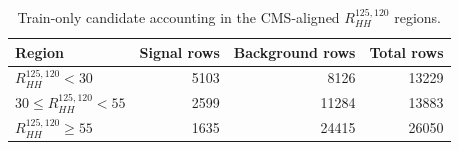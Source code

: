 \begin{table}[htbp]
\centering
\caption{Train-only candidate accounting in the CMS-aligned $R_{HH}^{125,120}$ regions.}
\label{tab:hh4b_expanded_cut_regions}
\begin{tabular}{lrrr}
\toprule
Region & Signal rows & Background rows & Total rows \\
\midrule
$R_{HH}^{125,120}<30$ & 5103 & 8126 & 13229 \\
$30\leq R_{HH}^{125,120}<55$ & 2599 & 11284 & 13883 \\
$R_{HH}^{125,120}\geq55$ & 1635 & 24415 & 26050 \\
\bottomrule
\end{tabular}
\end{table}
